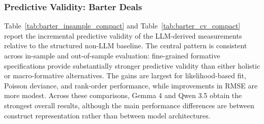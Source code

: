 \subsubsection{Predictive Validity: Barter Deals}\label{sec:results_pred_val}

Table~\ref{tab:barter_insample_compact} and Table~\ref{tab:barter_cv_compact} report the incremental predictive validity of the LLM-derived measurements relative to the structured non-LLM baseline. The central pattern is consistent across in-sample and out-of-sample evaluation: fine-grained formative specifications provide substantially stronger predictive validity than either holistic or macro-formative alternatives. The gains are largest for likelihood-based fit, Poisson deviance, and rank-order performance, while improvements in RMSE are more modest. Across these comparisons, Gemma 4 and Qwen 3.5 obtain the strongest overall results, although the main performance differences are between construct representation rather than between model architectures. 




